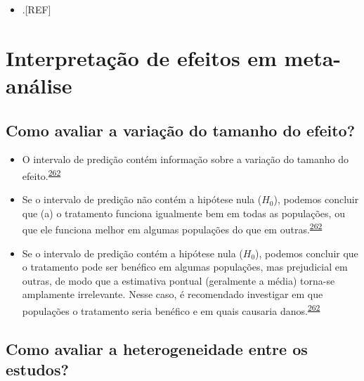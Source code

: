 \documentclass[
  a4paper,
]{book}
\providecommand{\tightlist}{%
  \setlength{\itemsep}{0pt}\setlength{\parskip}{0pt}}
\begin{document}
\begin{itemize}
\tightlist
\item
  .{[}REF{]}
\end{itemize}

\hypertarget{interpretacao}{%
\section{Interpretação de efeitos em meta-análise}\label{interpretacao}}

\hypertarget{como-avaliar-a-variauxe7uxe3o-do-tamanho-do-efeito}{%
\subsection{Como avaliar a variação do tamanho do efeito?}\label{como-avaliar-a-variauxe7uxe3o-do-tamanho-do-efeito}}

\begin{itemize}
\item
  O intervalo de predição contém informação sobre a variação do tamanho do efeito.\textsuperscript{\protect\hyperlink{ref-Borenstein2022}{262}}
\item
  Se o intervalo de predição não contém a hipótese nula (\(H_{0}\)), podemos concluir que (a) o tratamento funciona igualmente bem em todas as populações, ou que ele funciona melhor em algumas populações do que em outras.\textsuperscript{\protect\hyperlink{ref-Borenstein2022}{262}}
\item
  Se o intervalo de predição contém a hipótese nula (\(H_{0}\)), podemos concluir que o tratamento pode ser benéfico em algumas populações, mas prejudicial em outras, de modo que a estimativa pontual (geralmente a média) torna-se amplamente irrelevante. Nesse caso, é recomendado investigar em que populações o tratamento seria benéfico e em quais causaria danos.\textsuperscript{\protect\hyperlink{ref-Borenstein2022}{262}}
\end{itemize}

\hypertarget{como-avaliar-a-heterogeneidade-entre-os-estudos}{%
\subsection{Como avaliar a heterogeneidade entre os estudos?}\label{como-avaliar-a-heterogeneidade-entre-os-estudos}}
\end{document}
